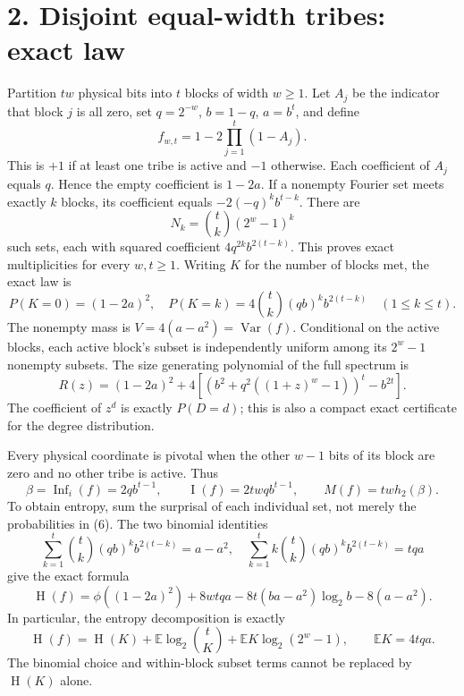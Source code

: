 \documentclass[11pt]{article}
\newcommand{\I}{\operatorname{I}}
\newcommand{\Var}{\operatorname{Var}}
\newcommand{\HH}{\operatorname{H}}
\begin{document}
\section*{2. Disjoint equal-width tribes: exact law}
Partition $tw$ physical bits into $t$ blocks of width $w\ge1$.
Let $A_j$ be the indicator that block $j$ is all zero, set
$q=2^{-w}$, $b=1-q$, $a=b^t$, and define
\[
 f_{w,t}=1-2\prod_{j=1}^t(1-A_j).
\]
This is $+1$ if at least one tribe is active and $-1$ otherwise.
Each coefficient of $A_j$ equals $q$. Hence the empty coefficient
is $1-2a$. If a nonempty Fourier set meets exactly $k$ blocks,
its coefficient equals $-2(-q)^k b^{t-k}$. There are
\[
 N_k={t\choose k}(2^w-1)^k                                    \tag{5}
\]
such sets, each with squared coefficient $4q^{2k}b^{2(t-k)}$.
This proves exact multiplicities for every $w,t\ge1$.
Writing $K$ for the number of blocks met, the exact law is
\[
 P(K=0)=(1-2a)^2,\quad
 P(K=k)=4{t\choose k}(qb)^k b^{2(t-k)}\quad(1\le k\le t).       \tag{6}
\]
The nonempty mass is $V=4(a-a^2)=\Var(f)$.
Conditional on the active blocks, each active block's subset is
independently uniform among its $2^w-1$ nonempty subsets.
The size generating polynomial of the full spectrum is
\[
 R(z)=(1-2a)^2+
 4\left[\left(b^2+q^2((1+z)^w-1)\right)^t-b^{2t}\right].       \tag{7}
\]
The coefficient of $z^d$ is exactly $P(D=d)$; this is also a
compact exact certificate for the degree distribution.

Every physical coordinate is pivotal when the other $w-1$ bits
of its block are zero and no other tribe is active. Thus
\[
 \beta=\operatorname{Inf}_i(f)=2q b^{t-1},\qquad
 \I(f)=2twq b^{t-1},\qquad M(f)=tw h_2(\beta).                 \tag{8}
\]
To obtain entropy, sum the surprisal of each individual set,
not merely the probabilities in (6). The two binomial identities
\[
 \sum_{k=1}^t {t\choose k}(qb)^k b^{2(t-k)}=a-a^2,
 \quad
 \sum_{k=1}^t k{t\choose k}(qb)^k b^{2(t-k)}=tqa
\]
give the exact formula
\[
 \boxed{\HH(f)=\phi((1-2a)^2)+8wtqa
     -8t(ba-a^2)\log_2 b-8(a-a^2).}                           \tag{9}
\]
In particular, the entropy decomposition is exactly
\[
 \HH(f)=\HH(K)+\mathbb E\log_2{t\choose K}
                  +\mathbb E K\log_2(2^w-1),\qquad
 \mathbb E K=4tqa.                                            \tag{10}
\]
The binomial choice and within-block subset terms cannot be
replaced by $\HH(K)$ alone.
\end{document}
